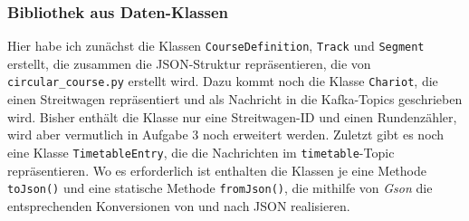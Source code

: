 \documentclass[12pt]{article}
\begin{document}
\subsubsection*{Bibliothek aus Daten-Klassen}
Hier habe ich zunächst die Klassen \texttt{CourseDefinition}, \texttt{Track} und \texttt{Segment} erstellt, die zusammen die JSON-Struktur repräsentieren, die von \texttt{circular\_course.py} erstellt wird.
Dazu kommt noch die Klasse \texttt{Chariot}, die einen Streitwagen repräsentiert und als Nachricht in die Kafka-Topics geschrieben wird.
Bisher enthält die Klasse nur eine Streitwagen-ID und einen Rundenzähler, wird aber vermutlich in Aufgabe 3 noch erweitert werden.
Zuletzt gibt es noch eine Klasse \texttt{TimetableEntry}, die die Nachrichten im \texttt{timetable}-Topic repräsentieren.
Wo es erforderlich ist enthalten die Klassen je eine Methode \texttt{toJson()} und eine statische Methode \texttt{fromJson()}, die mithilfe von \emph{Gson} die entsprechenden Konversionen von und nach JSON realisieren.
\end{document}
